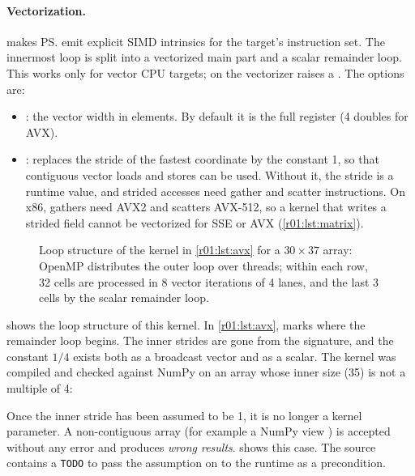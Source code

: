 \paragraph{Vectorization.}
 makes \ps{} emit explicit SIMD intrinsics for the
target's instruction set. The innermost loop is split into a vectorized main part and a
scalar remainder loop. This works only for vector CPU targets; on  the
vectorizer raises a . The options are:
\begin{itemize}
  \item {}: the vector width in elements. By default it is the full register
        (4 doubles for AVX).
  \item {}: replaces the stride of the fastest coordinate by
        the constant 1, so that contiguous vector loads and stores can be used. Without
        it, the stride is a runtime value, and strided accesses need gather and scatter
        instructions. On x86, gathers need AVX2 and scatters AVX-512, so a kernel that
        writes a strided field cannot be vectorized for SSE or AVX
        (\cref{r01:lst:matrix}).
\end{itemize}

\begin{figure}[htbp]
  \centering
  
  \caption[OpenMP and SIMD loop structure]{Loop structure of the kernel in \cref{r01:lst:avx} for a $30\times37$ array: OpenMP distributes the outer loop over threads; within each row, 32 cells are processed in 8 vector iterations of 4 lanes, and the last 3 cells by the scalar remainder loop.}
  \label{r01:fig:vectorization}
\end{figure}

 shows the loop structure of this kernel.
In \cref{r01:lst:avx},  marks where the remainder loop begins. The
inner strides are gone from the signature, and the constant $1/4$ exists both as a
broadcast vector and as a scalar. The kernel was compiled and checked against NumPy on
an array whose inner size (35) is not a multiple of 4:

\begin{pitfall}
  Once the inner stride has been assumed to be 1, it is no longer a kernel parameter. A
  non-contiguous array (for example a NumPy view ) is accepted without
  any error and produces \emph{wrong results}.  shows this case.
  The source contains a \texttt{TODO} to pass the assumption on to the runtime as a
  precondition.
\end{pitfall}

